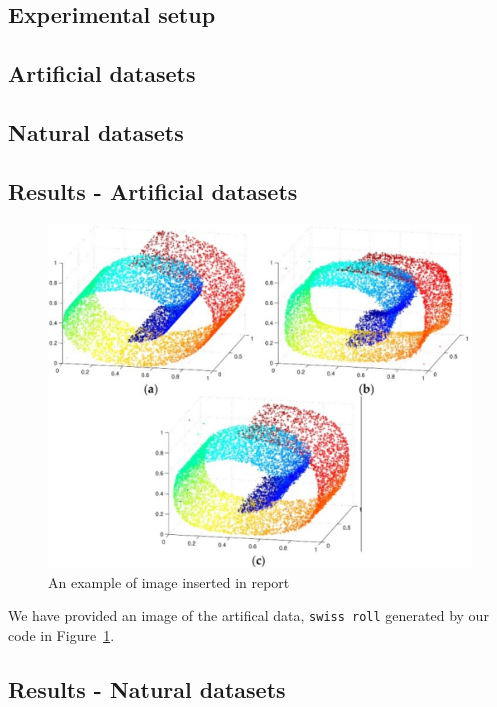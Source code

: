 \documentclass[a4paper,11pt,twocolumn]{article}
\begin{document}
\subsection{Experimental setup}
\lipsum[1]
\subsection{Artificial datasets}
\lipsum[2]
\subsection{Natural datasets}
\lipsum[3]
\subsection{Results - Artificial datasets}
\lipsum[1]
\begin{figure}[h!t]
    \centering
    \includegraphics[scale=0.3]{swiss_roll.png}
    \caption{An example of image inserted in report}
    \label{fig:swiss_roll}
\end{figure}
We have provided an image of the artifical data, \texttt{swiss roll} generated by our code in Figure~\ref{fig:swiss_roll}.

\subsection{Results - Natural datasets}
\lipsum[3]
\end{document}
